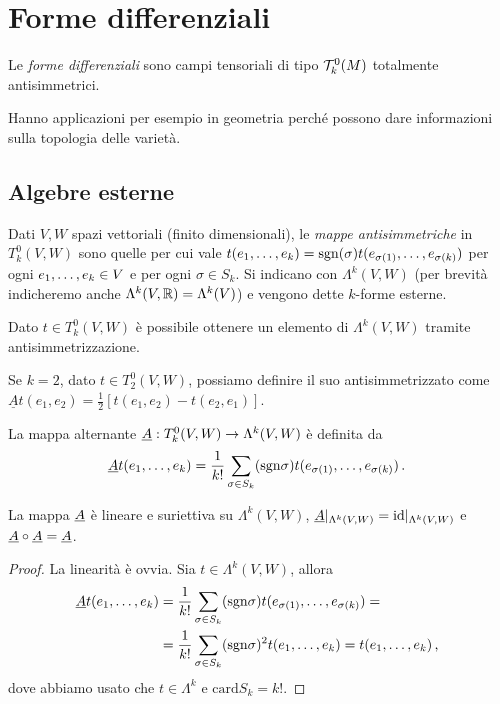 \chapter{Forme differenziali} %

\begin{definition} 
	Le \emph{forme differenziali} sono campi tensoriali di tipo $\Tau_k^0(M)$ totalmente antisimmetrici.
\end{definition}

Hanno applicazioni per esempio in geometria perché possono dare informazioni sulla topologia delle varietà.

\section{Algebre esterne}

\begin{definition}
 
Dati $V,W$ spazi vettoriali (finito dimensionali), le \emph{mappe antisimmetriche} in $T^0_k(V,W)$ sono quelle per cui vale $t(\seqb{e}{k}{,}) = \sgn(\sigma) t(e_{\sigma(1)},\ldots, e_{\sigma(k)})$ per ogni $\seqb{e}{k}{,} \in V$ e per ogni $\sigma\in S_k$.
Si indicano con $\Lambda^k(V,W)$ (per brevità indicheremo anche $\Lambda^k(V,\R) = \Lambda^k(V)$) e vengono dette $k$-forme esterne.

\end{definition}

Dato $t\in T^0_k(V,W)$ è possibile ottenere un elemento di $\Lambda^k(V,W)$ tramite antisimmetrizzazione. 
\begin{example}
	Se $k=2$, dato $t\in T^0_2(V,W)$, possiamo definire il suo antisimmetrizzato come $\underline{A}t(e_1,e_2) = \frac 12 [t(e_1,e_2) - t(e_2,e_1)]$.
\end{example}

\begin{definition}
	La mappa alternante $\antisimm:T^0_k(V,W) \to \Lambda^k(V,W)$ è definita da
	\begin{equation*}
		\antisimm t(\seqb{e}{k}{,}) = \frac 1 {k!} \sum_{\sigma \in S_k} (\sgn \sigma) t(e_{\sigma(1)},\ldots, e_{\sigma(k)}) \punto
	\end{equation*}
\end{definition}

\begin{proposition}
	La mappa $\antisimm$ è lineare e suriettiva su $\Lambda^k(V,W)$, $\antisimm\restrict{\Lambda^k(V,W)} = \id\restrict{\Lambda^k(V,W)}$ e $\antisimm \circ \antisimm = \antisimm$.
\end{proposition}
\begin{proof}
	La linearità è ovvia. Sia $t\in\Lambda^k(V,W)$, allora
	\begin{align*}
		\antisimm t(\seqb{e}{k}{,}) &= \frac 1 {k!} \sum_{\sigma \in S_k} (\sgn \sigma) t(e_{\sigma(1)},\ldots, e_{\sigma(k)}) =\\
		& = \frac 1 {k!} \sum_{\sigma \in S_k} (\sgn \sigma)^2 t(\seqb{e}{k}{,}) = t (\seqb{e}{k}{,}) \virgola
	\end{align*}
	dove abbiamo usato che $t\in\Lambda^k$ e $\mathrm{card} S_k = k!$.
\end{proof}

